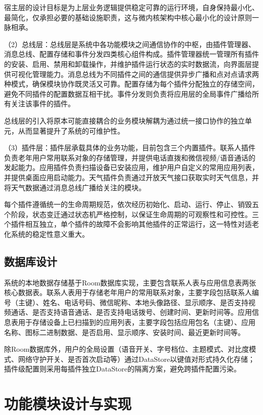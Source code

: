 宿主层的设计目标是为上层业务逻辑提供稳定可靠的运行环境，自身保持最小化、最简化，仅承担必要的基础设施职责，这与微内核架构中核心最小化的设计原则一脉相承。

（2）总线层：总线层是系统中各功能模块之间通信协作的中枢，由插件管理器、消息总线、配置存储和事件分发四类核心组件构成。插件管理器统一管理所有插件的安装、启用、禁用和卸载操作，并维护插件运行状态的实时数据流，向界面层提供可视化管理能力。消息总线为不同插件之间的通信提供异步广播和点对点请求两种模式，确保模块协作既灵活又可靠。配置存储为每个插件分配独立的存储空间，避免不同插件的配置数据互相干扰。事件分发则负责将应用层的全局事件广播给所有关注该事件的插件。

总线层的引入将原本可能直接耦合的业务模块解耦为通过统一接口协作的独立单元，从而显著提升了系统的可维护性。

（3）插件层：插件层承载具体的业务功能，目前包含三个内置插件。联系人插件负责老年用户常用联系对象的存储管理，并提供电话直拨和微信视频/语音通话的发起能力。应用插件负责扫描设备已安装应用，维护用户自定义的常用应用列表，并提供桌面应用启动能力。天气插件负责通过开放天气接口获取实时天气信息，并将天气数据通过消息总线广播给关注的模块。

每个插件遵循统一的生命周期规范，依次经历初始化、启动、运行、停止、销毁五个阶段，状态变迁通过状态机严格控制，以保证生命周期的可观察性和可控性。三个插件相互独立，单个插件的故障不会影响其他插件的正常运行，这一特性对适老化系统的稳定性意义重大。

\subsection{数据库设计}

系统的本地数据存储基于Room数据库实现，主要包含联系人表与应用信息表两张核心数据表。联系人表用于存储老年用户的常用联系对象，主要字段包括联系人编号（主键）、姓名、电话号码、微信昵称、本地头像路径、显示顺序、是否支持视频通话、是否支持语音通话、是否支持电话拨号、创建时间、更新时间等。应用信息表用于存储设备上已扫描到的应用列表，主要字段包括应用包名（主键）、应用名称、图标二进制数据、是否启用、显示顺序、安装时间、最近更新时间等。

除Room数据库外，用户的全局设置（语音开关、字号档位、主题模式、对比度模式、网络守护开关、是否首次启动等）通过DataStore以键值对形式持久化存储；插件级配置则采用每插件独立DataStore的隔离方案，避免跨插件配置污染。

\section{功能模块设计与实现}

